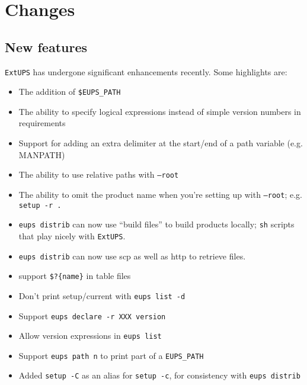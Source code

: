 \documentclass{article}
\newcommand{\code}[1]{\texttt{#1}}
\newcommand{\eups}{\code{ExtUPS}\xspace}
\begin{document}
\section{Changes}
\subsection{New features}

\eups has undergone significant enhancements recently.  Some
highlights are:

\begin{itemize}
  \item
    The addition of \code{\$EUPS\_PATH}

  \item
    The ability to specify logical expressions instead
    of simple version numbers in requirements

  \item
    Support for adding an extra delimiter at the
    start/end of a path variable (e.g. MANPATH)

  \item
    The ability to use relative paths with \code{--root}

  \item
    The ability to omit the product name when you're
    setting up with \code{--root}; e.g. \code{setup -r .}

  \item
    \code{eups distrib} can now use ``build files'' to
    build products locally; \code{sh} scripts that
    play nicely with \eups.

  \item
    \code{eups distrib} can now use scp as well as http to
    retrieve files.

  \item
    support \code{\$?\{name\}} in table files

  \item
    Don't print setup/current with \code{eups list -d}


  \item
    Support \code{eups declare -r XXX version}

  \item
    Allow version expressions in \code{eups list}

  \item
    Support \code{eups path n} to print part of a \code{EUPS\_PATH}

  \item
    Added \code{setup -C} as an alias for \code{setup -c}, for consistency with \code{eups distrib}


\end{itemize}
\end{document}
